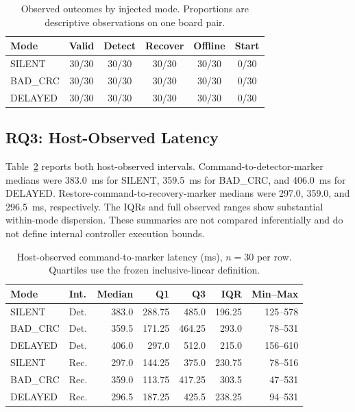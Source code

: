 \documentclass[conference]{IEEEtran}
\begin{document}
\begin{table}[t]
\caption{Observed outcomes by injected mode. Proportions are descriptive observations on one board pair.}
\label{tab:outcomes}
\centering
\footnotesize
\begin{tabular}{lccccc}
\toprule
Mode & Valid & Detect & Recover & Offline & Start \\
\midrule
SILENT   & 30/30 & 30/30 & 30/30 & 30/30 & 0/30 \\
BAD\_CRC  & 30/30 & 30/30 & 30/30 & 30/30 & 0/30 \\
DELAYED  & 30/30 & 30/30 & 30/30 & 30/30 & 0/30 \\
\bottomrule
\end{tabular}
\end{table}

\subsection{RQ3: Host-Observed Latency}

Table~\ref{tab:latency} reports both host-observed intervals. Command-to-detector-marker medians were 383.0~ms for SILENT, 359.5~ms for BAD\_CRC, and 406.0~ms for DELAYED. Restore-command-to-recovery-marker medians were 297.0, 359.0, and 296.5~ms, respectively. The IQRs and full observed ranges show substantial within-mode dispersion. These summaries are not compared inferentially and do not define internal controller execution bounds.

\begin{table}[t]
\caption{Host-observed command-to-marker latency (ms), $n=30$ per row. Quartiles use the frozen inclusive-linear definition.}
\label{tab:latency}
\centering
\scriptsize
\begin{tabular}{@{}llrrrrr@{}}
\toprule
Mode & Int. & Median & Q1 & Q3 & IQR & Min--Max \\
\midrule
SILENT & Det. & 383.0 & 288.75 & 485.0 & 196.25 & 125--578 \\
BAD\_CRC & Det. & 359.5 & 171.25 & 464.25 & 293.0 & 78--531 \\
DELAYED & Det. & 406.0 & 297.0 & 512.0 & 215.0 & 156--610 \\
\midrule
SILENT & Rec. & 297.0 & 144.25 & 375.0 & 230.75 & 78--516 \\
BAD\_CRC & Rec. & 359.0 & 113.75 & 417.25 & 303.5 & 47--531 \\
DELAYED & Rec. & 296.5 & 187.25 & 425.5 & 238.25 & 94--531 \\
\bottomrule
\end{tabular}
\end{table}
\end{document}
